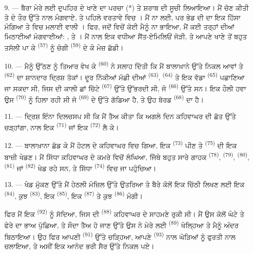 9. --- ਬੈਰਾ ਮੇਰੇ ਲਈ ਦੁਪਹਿਰ ਦੇ ਖਾਣੇ ਦਾ ਪਰਚਾ (*) ਤੇ ਸ਼ਰਾਬ ਦੀ ਸੂਚੀ ਲਿਆਇਆ। ਮੈਂ ਚੋਣ
ਕੀਤੀ ਤੇ  ਦੇ ਤੌਰ ਉੱਤੇ  ਨਾਲ 
ਮੰਗਵਾਏ, ਤੇ ਪਹਿਲੇ ਵਰਤਾਵੇ ਵਿਚ । ਮੈਂ  ਨਾ ਲਈ,
ਪਰ ਭੇਡ ਦੀ  ਦਾ ਇਕ ਹਿੱਸਾ ਮੰਗਿਆ ਤੇ  ਵਿਚ ਮਲਾਈ ਵਾਲੀ
। ਫਿਰ, ਜਦੋਂ  ਵਿਚੋਂ ਕੋਈ ਮੈਨੂੰ ਨਾ ਭਾਇਆ, ਮੈਂ ਕਈ
ਤਰ੍ਹਾਂ ਦੀਆਂ ਮਿਠਾਈਆਂ ਮੰਗਵਾਈਆਂ: ,  ਤੇ ।
ਮੈਂ ਨਾਲ ਇਕ ਵਧੀਆ ਸੈਂਤ-ਏਮਿਲਿਓਂ  ਜੋੜੀ, ਤੇ ਆਪਣੇ ਖਾਣੇ ਤੋਂ ਬਹੁਤ ਤਸੱਲੀ ਪਾ
ਕੇ  \textsuperscript{(57)} ਨੂੰ ਚੰਗੀ 
\textsuperscript{(59)} ਦੇ ਕੇ ਮੇਜ਼ ਛੱਡੀ।

10. --- ਮੈਨੂੰ ਉੱਠਣ ਨੂੰ ਤਿਆਰ ਵੇਖ ਕੇ  \textsuperscript{(60)} ਨੇ ਸਲਾਹ
ਦਿੱਤੀ ਕਿ ਮੈਂ ਬਾਲਾਖ਼ਾਨੇ ਉੱਤੇ ਨਿਕਲ ਆਵਾਂ ਤੇ  \textsuperscript{(62)}
ਦਾ ਸ਼ਾਨਦਾਰ ਦ੍ਰਿਸ਼ ਤੱਕਾਂ। ਦੂਰ ਨਿੱਕੀਆਂ ਮੱਛੀ ਦੀਆਂ 
\textsuperscript{(63)},  \textsuperscript{(64)} ਤੇ ਇਕ ਵੱਡਾ
 \textsuperscript{(65)} ਪਛਾਣਿਆ ਜਾ ਸਕਦਾ ਸੀ, ਜਿਸ ਦੀ ਕਾਲੀ ਛਾਂ
ਚਿੱਟੇ  \textsuperscript{(67)} ਉੱਤੇ ਉੱਭਰਦੀ ਸੀ, ਜੋ
 \textsuperscript{(66)} ਉੱਤੇ ਸਨ। ਇਕ ਹੌਲੀ ਹਵਾ ਉਸ 
\textsuperscript{(70)} ਨੂੰ ਹਿਲਾ ਰਹੀ ਸੀ ਜੋ  \textsuperscript{(69)} ਦੇ ਉੱਤੇ
ਗੱਡਿਆ ਹੈ, ਤੇ ਉਹ ਬੋਰਡ  \textsuperscript{(68)} ਦਾ ਹੈ।

\VUsaut{3.0mm}
\VUsaut{3.0mm}

11. --- ਦ੍ਰਿਸ਼ ਇੰਨਾ ਦਿਲਚਸਪ ਸੀ ਕਿ ਮੈਂ ਤੈਅ ਕੀਤਾ ਕਿ ਅਗਲੇ ਦਿਨ ਕਹਿਵਾਘਰ ਦੀ ਛੱਤ ਉੱਤੇ
ਚੜ੍ਹਾਂਗਾ, ਨਾਲ ਇਕ  \textsuperscript{(71)} ਜਾਂ ਇਕ 
\textsuperscript{(72)} ਲੈ ਕੇ।

12. --- ਬਾਲਾਖ਼ਾਨਾ ਛੱਡ ਕੇ ਮੈਂ ਹੋਟਲ ਦੇ ਕਹਿਵਾਘਰ ਵਿਚ ਗਿਆ, ਇਕ 
\textsuperscript{(73)} ਪੀਣ ਤੇ  \textsuperscript{(75)} ਦੀ ਇਕ ਬਾਜ਼ੀ
ਖੇਡਣ। ਮੈਂ ਸਿੱਧਾ ਕਹਿਵਾਘਰ ਦੇ ਕਮਰੇ ਵਿਚੋਂ ਲੰਘਿਆ, ਜਿੱਥੇ ਬਹੁਤ ਸਾਰੇ ਗਾਹਕ
 \textsuperscript{(78)},  \textsuperscript{(79)},
 \textsuperscript{(80)},  \textsuperscript{(81)} ਜਾਂ
 \textsuperscript{(82)} ਖੇਡ ਰਹੇ ਸਨ, ਤੇ ਸਿੱਧਾ 
\textsuperscript{(74)} ਵਿਚ ਜਾ ਪਹੁੰਚਿਆ।

13. --- ਖੇਡ ਮੁੱਕਣ ਉੱਤੇ ਮੈਂ ਹੇਠਲੀ ਮੰਜ਼ਿਲ ਉੱਤੇ ਉਤਰਿਆ ਤੇ ਬੈਰੇ ਕੋਲੋਂ ਇਕ ਚਿੱਠੀ ਲਿਖਣ ਲਈ
ਇਕ  \textsuperscript{(84)}, ਕੁਝ 
\textsuperscript{(83)}, ਇਕ  \textsuperscript{(85)}, ਇਕ
 \textsuperscript{(87)} ਤੇ ਕੁਝ  \textsuperscript{(86)}
ਮੰਗੀ।

ਫਿਰ ਮੈਂ ਇਕ  \textsuperscript{(92)} ਨੂੰ ਸੱਦਿਆ, ਜਿਸ ਦੀ 
\textsuperscript{(88)} ਕਹਿਵਾਘਰ ਦੇ ਸਾਹਮਣੇ ਰੁਕੀ ਸੀ। ਮੈਂ ਉਸ ਕੋਲੋਂ ਘੰਟੇ ਤੇ ਫੇਰੇ ਦਾ ਭਾਅ
ਪੁੱਛਿਆ, ਤੇ ਸੌਦਾ ਤੈਅ ਹੋ ਜਾਣ ਉੱਤੇ ਉਸ ਨੇ ਮੇਰੇ ਲਈ 
\textsuperscript{(89)} ਖੋਲ੍ਹਿਆ ਤੇ ਮੈਨੂੰ ਅੰਦਰ ਬਿਠਾਇਆ। ਉਹ ਫਿਰ ਆਪਣੀ 
\textsuperscript{(91)} ਉੱਤੇ ਚੜ੍ਹਿਆ, ਆਪਣੇ  \textsuperscript{(93)} ਨਾਲ
ਘੋੜਿਆਂ ਨੂੰ ਫੁਰਤੀ ਨਾਲ ਚਲਾਇਆ, ਤੇ ਅਸੀਂ ਇਕ ਆਨੰਦ ਭਰੀ ਸੈਰ ਉੱਤੇ ਨਿਕਲ ਪਏ।
\VUsaut{6.0mm}
\VUfilet{22mm}

